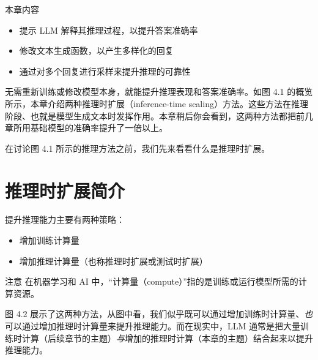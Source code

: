 \begin{myChapterIntro}{本章内容}
\begin{itemize}
\item 提示 LLM 解释其推理过程，以提升答案准确率
\item 修改文本生成函数，以产生多样化的回复
\item 通过对多个回复进行采样来提升推理的可靠性
\end{itemize}
\end{myChapterIntro}

无需重新训练或修改模型本身，就能提升推理表现和答案准确率。如图 4.1 的概览所示，本章介绍两种推理时扩展（inference-time scaling）方法。这些方法在推理阶段、也就是模型生成文本时发挥作用。本章稍后你会看到，这两种方法都把前几章所用基础模型的准确率提升了一倍以上。

在讨论图 4.1 所示的推理方法之前，我们先来看看什么是推理时扩展。


\section{推理时扩展简介}

提升推理能力主要有两种策略：

\begin{itemize}
\item 增加训练计算量
\item 增加推理计算量（也称推理时扩展或测试时扩展）
\end{itemize}

\begin{myWarning}{注意}
 在机器学习和 AI 中，“计算量（compute）”指的是训练或运行模型所需的计算资源。\end{myWarning}

图 4.2 展示了这两种方法，从图中看，我们似乎既可以通过增加训练时计算量、\emph{也}可以通过增加推理时计算量来提升推理能力。而在现实中，LLM 通常是把大量训练时计算（后续章节的主题）\emph{与}增加的推理时计算（本章的主题）结合起来以提升推理能力。


